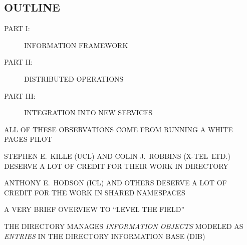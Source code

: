 


\begin{bwslide}
\part*	{OUTLINE}\bf

\begin{description}
\item[PART I:]		INFORMATION FRAMEWORK

\item[PART II:]		DISTRIBUTED OPERATIONS

\item[PART III:]	INTEGRATION INTO NEW SERVICES
\end{description}
\end{bwslide}


\begin{bwslide}

\begin{nrtc}
\item	ALL OF THESE OBSERVATIONS COME FROM RUNNING A WHITE PAGES PILOT

\item	STEPHEN E.~KILLE (UCL) AND COLIN J.~ROBBINS (X-TEL~LTD.)
	DESERVE A LOT OF CREDIT FOR THEIR WORK IN DIRECTORY

\item	ANTHONY E.~HODSON (ICL) AND OTHERS DESERVE A LOT OF CREDIT FOR
	THE WORK IN SHARED NAMESPACES
\end{nrtc}
\end{bwslide}


\begin{bwslide}

\begin{nrtc}
\item	A VERY BRIEF OVERVIEW TO ``LEVEL THE FIELD''

\item	THE DIRECTORY MANAGES \emph{INFORMATION OBJECTS} MODELED AS
	\emph{ENTRIES} IN THE DIRECTORY INFORMATION BASE (DIB)
\end{nrtc}
\end{bwslide}




